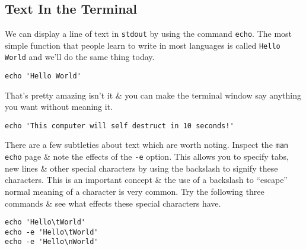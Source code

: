 
\chapter{\moduleTitle}
\newpage

\section{Text In the Terminal}
We can display a line of text in \texttt{stdout} by using the command \texttt{echo}.
The most simple function that people learn to write in most languages is called \texttt{Hello World} and we'll do the same thing today.
\begin{steps}
\begin{lstlisting}
echo 'Hello World'
\end{lstlisting}
\end{steps}
That's pretty amazing isn't it \& you can make the terminal window say anything you want without meaning it.\\
\begin{lstlisting}
echo 'This computer will self destruct in 10 seconds!'
\end{lstlisting}

\begin{information}
There are a few subtleties about text which are worth noting.
Inspect the \texttt{man echo} page \& note the effects of the \texttt{-e} option.
This allows you to specify tabs, new lines \& other special characters by using the backslash to signify these characters.
This is an important concept \& the use of a backslash to ``escape'' normal meaning of a character is very common.
Try the following three commands \& see what effects these special characters have.
\end{information}
\begin{steps}
\begin{lstlisting}
echo 'Hello\tWorld'
echo -e 'Hello\tWorld'
echo -e 'Hello\nWorld'
\end{lstlisting}
\end{steps}

